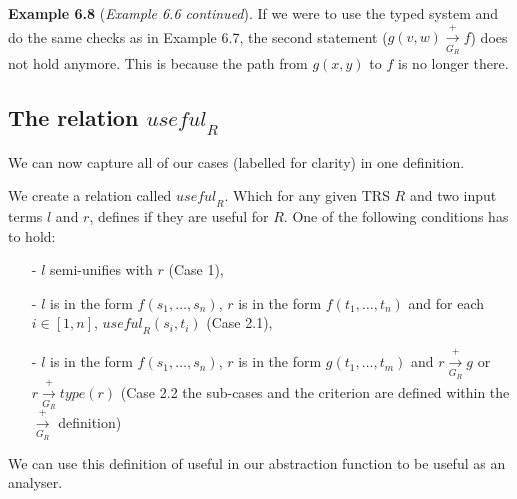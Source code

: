 \textbf{Example 6.8} (\textit{Example 6.6 continued}). If we were to use the typed system and do the same checks as in Example 6.7, the second statement ($g(v, w) \xrightarrow[G_R]{+} f$) does not hold anymore. This is because the path from $g(x, y)$ to $f$ is no longer there.

\subsection*{The relation $\textit{useful}_R$}
We can now capture all of our cases (labelled for clarity) in one definition. 
\begin{definition}
\label{def:useful}
We create a relation called $\textit{useful}_R$. Which for any given TRS $R$ and two input terms $l$ and $r$, defines if they are useful for $R$. One of the following conditions has to hold:
\begin{itemize}
    \itemsep -.1em
    \item[-] $l$ semi-unifies with $r$ (Case 1),
    \item[-] $l$ is in the form $f(s_1, \dots, s_n)$, $r$ is in the form $f(t_1, \dots, t_n)$ and for each $i \in [1, n]$, $\textit{useful}_R(s_i, t_i)$ (Case 2.1),
    \item[-] $l$ is in the form $f(s_1, \dots, s_n)$, $r$ is in the form $g(t_1, \dots, t_m)$ and $r \xrightarrow[G_R]{+} g$ or $r \xrightarrow[G_R]{+} \textit{type}(r)$ (Case 2.2 the sub-cases and the criterion are defined within the $\xrightarrow[G_R]{+}$ definition)
\end{itemize}
\end{definition}

We can use this definition of useful in our abstraction function to be useful as an analyser. 

